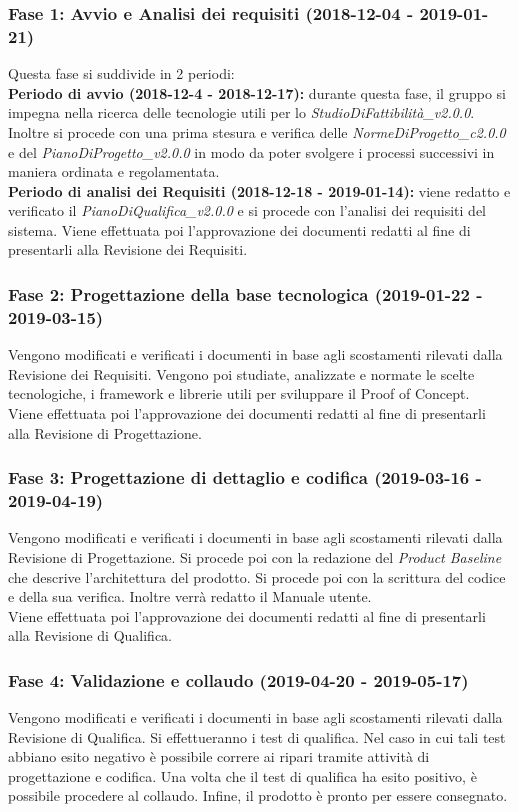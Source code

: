 \subsubsection{Fase 1: Avvio e Analisi dei requisiti (2018-12-04 - 2019-01-21)} 
Questa fase si suddivide in 2 periodi: \\
\textbf{Periodo di avvio (2018-12-4 - 2018-12-17):} 
durante questa fase, il gruppo si impegna nella ricerca delle tecnologie utili per lo \textit{StudioDiFattibilità\_v2.0.0}. Inoltre si procede con una prima stesura e verifica delle \textit{NormeDiProgetto\_c2.0.0} e del \textit{PianoDiProgetto\_v2.0.0} in modo da poter svolgere i processi successivi in maniera ordinata e regolamentata.\\
\textbf{Periodo di analisi dei Requisiti (2018-12-18 - 2019-01-14):} viene redatto e verificato il \textit{PianoDiQualifica\_v2.0.0} e si procede con l'analisi dei requisiti del sistema.
Viene effettuata poi l'approvazione dei documenti redatti al fine di presentarli alla Revisione dei Requisiti.
\subsubsection{Fase 2: Progettazione della base tecnologica (2019-01-22 - 2019-03-15)}
Vengono modificati e verificati i documenti in base agli scostamenti rilevati dalla Revisione dei Requisiti.
Vengono poi studiate, analizzate e normate le scelte tecnologiche, i framework e librerie utili per sviluppare il Proof of Concept.\\
Viene effettuata poi l'approvazione dei documenti redatti al fine di presentarli alla Revisione di Progettazione.

\subsubsection{Fase 3: Progettazione di dettaglio e codifica (2019-03-16 - 2019-04-19)}
Vengono modificati e verificati i documenti in base agli scostamenti rilevati dalla Revisione di Progettazione.
Si procede poi con la redazione del \textit{Product Baseline} che descrive l'architettura del prodotto.
Si procede poi con la scrittura del codice e della sua verifica.
Inoltre verrà redatto il Manuale utente.\\
Viene effettuata poi l'approvazione dei documenti redatti al fine di presentarli alla Revisione di Qualifica.
\subsubsection{Fase 4: Validazione e collaudo (2019-04-20 - 2019-05-17)}
Vengono modificati e verificati i documenti in base agli scostamenti rilevati dalla Revisione di Qualifica.
Si effettueranno i test di qualifica. Nel caso in cui tali test abbiano esito negativo è possibile correre ai ripari tramite attività di progettazione e codifica. Una volta che il test di qualifica ha esito positivo, è possibile procedere al collaudo.
Infine, il prodotto è pronto per essere consegnato.

